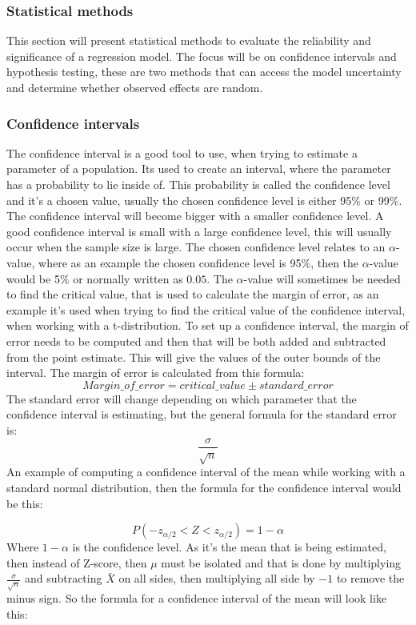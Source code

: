 \subsubsection{Statistical methods}
This section will present statistical methods to evaluate the reliability and significance of a regression model. The focus will be on confidence intervals and hypothesis testing, these are two methods that can access the model uncertainty and determine whether observed effects are random.
\subsubsection{Confidence intervals}
The confidence interval is a good tool to use, when trying to estimate a parameter of a population. Its used to create an interval, where the parameter has a probability to lie inside of. This probability is called the confidence level and it's a chosen value, usually the chosen confidence level is either 95\% or 99\%. The confidence interval will become bigger with a smaller confidence level. A good confidence interval is small with a large confidence level, this will usually occur when the sample size is large. The chosen confidence level relates to an $\alpha$-value, where as an example the chosen confidence level is 95\%, then the $\alpha$-value would be 5\% or normally written as $0.05$. The $\alpha$-value will sometimes be needed to find the critical value, that is used to calculate the margin of error, as an example it's used when trying to find the critical value of the confidence interval, when working with a t-distribution.
\newline
To set up a confidence interval, the margin of error needs to be computed and then that will be both added and subtracted from the point estimate. This will give the values of the outer bounds of the interval. The margin of error is calculated from this formula:
$$Margin\_of\_error = critical\_value \pm standard\_error$$
\newline
The standard error will change depending on which parameter that the confidence interval is estimating, but the general formula for the standard error is:
$$\frac{\sigma}{\sqrt{n}}$$
\newline
An example of computing a confidence interval of the mean while working with a standard normal distribution, then the formula for the confidence interval would be this:

$$P(-z_{\alpha/2}<Z<z_{\alpha/2}) = 1-\alpha$$
\newline
Where $1-\alpha$ is the confidence level. As it's the mean that is being estimated, then instead of Z-score, then $\mu$ must be isolated and that is done by multiplying $\frac{\sigma}{\sqrt{n}}$ and subtracting $\bar{X}$ on all sides, then multiplying all side by $-1$ to remove the minus sign. So the formula for a confidence interval of the mean will look like this:

